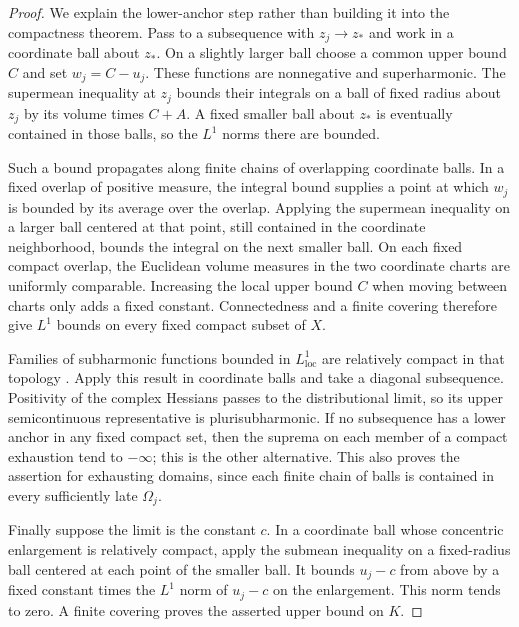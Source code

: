\begin{proof}
We explain the lower-anchor step rather than building it into the
compactness theorem.  Pass to a subsequence with $z_j\to z_*$ and
work in a coordinate ball about $z_*$.  On a slightly larger ball
choose a common upper bound $C$ and set $w_j=C-u_j$.
These functions are nonnegative and superharmonic.  The supermean
inequality at $z_j$ bounds their integrals on a ball of fixed radius
about $z_j$ by its volume times $C+A$.  A fixed smaller ball about
$z_*$ is eventually contained in those balls, so the $L^1$ norms
there are bounded.

Such a bound propagates along finite chains of overlapping coordinate
balls.  In a fixed overlap of positive measure, the integral bound
supplies a point at which $w_j$ is bounded by its average over the
overlap.  Applying the supermean inequality on a larger ball centered
at that point, still contained in the coordinate neighborhood, bounds
the integral on the next smaller ball.  On each fixed compact overlap, the Euclidean volume measures in
the two coordinate charts are uniformly comparable.  Increasing the
local upper bound $C$ when moving between charts only adds a fixed constant.
Connectedness and a finite covering therefore give $L^1$ bounds on
every fixed compact subset of $X$.

Families of subharmonic functions bounded in $L^1_{\mathrm{loc}}$
are relatively compact in that topology \cite[Chapter~I, Proposition~4.21]{DemaillyBook}.
Apply this result in coordinate balls and take a diagonal subsequence.
Positivity of the complex Hessians passes to the distributional
limit, so its upper semicontinuous representative is
plurisubharmonic.  If no subsequence has a lower anchor in any fixed
compact set, then the suprema on each member of a compact exhaustion
tend to $-\infty$; this is the other alternative.  This also proves
the assertion for exhausting domains, since each finite chain of
balls is contained in every sufficiently late $\Omega_j$.

Finally suppose the limit is the constant $c$.  In a coordinate ball
whose concentric enlargement is relatively compact, apply the
submean inequality on a fixed-radius ball centered at each point of
the smaller ball.  It bounds $u_j-c$ from above by a fixed constant
times the $L^1$ norm of $u_j-c$ on the enlargement.  This norm tends
to zero.  A finite covering proves the asserted upper bound on $K$.
\end{proof}

